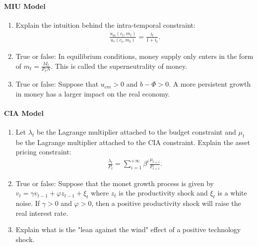 \documentclass[12pt]{article}
\begin{document}
\newpage
\paragraph{MIU Model}
\begin{enumerate}[label=\arabic*.]
    \item Explain the intuition behind the intra-temporal constraint:
    \begin{align*}
        \frac{u_m(c_t, m_t)}{u_c(c_t, m_t)} = \frac{i_t}{1+i_t}.
    \end{align*}
    \item True or false: In equilibrium conditions, money supply only enters in the form of $m_t = \frac{M_t}{P_t N}$. This is called the superneutrality of money.
    \item True or false: Suppose that $u_{cm} > 0$ and $b - \Phi > 0$. A more persistent growth in money has a larger impact on the real economy.
\end{enumerate}

\newpage
\paragraph{CIA Model}
\begin{enumerate}[label=\arabic*.]
    \item Let $\lambda_t$ be the Lagrange multiplier attached to the budget constraint and $\mu_t$ be the Lagrange multiplier attached to the CIA constraint. Explain the asset pricing constraint:
    \begin{align*}
        \frac{\lambda_{t}}{P_t} = \sum_{i=1}^{+\infty} \beta^i \frac{\mu_{t+i}}{P_{t+i}}.
    \end{align*}
    \item True or false: Suppose that the monet growth process is given by $v_t = \gamma v_{t-1} + \varphi z_{t-1} + \xi_t$ where $z_t$ is the productivity shock and $\xi_t$ is a white noise. If $\gamma > 0$ and $\varphi > 0$, then a positive productivity shock will raise the real interest rate.
    \item Explain what is the "lean against the wind" effect of a positive technology shock.
\end{enumerate}
\end{document}
